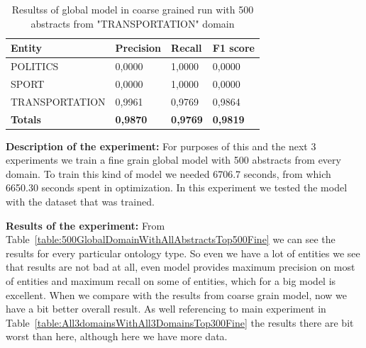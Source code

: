\documentclass[thesis=M,english]{FITthesis}[2018/05/30]
\begin{document}
	\begin{table}[H]\centering
		\begin{tabular}{|l|l|l|l|}
			\hline {\textbf{Entity}} & {\textbf{Precision}} & {\textbf{Recall}} & {\textbf{F1 score}}\\\hline
				POLITICS & 0,0000 & 1,0000 & 0,0000\\
				SPORT & 0,0000 & 1,0000 & 0,0000\\
				TRANSPORTATION & 0,9961 & 0,9769 & 0,9864\\\hline
				\textbf{Totals} & \textbf{0,9870} & \textbf{0,9769} & \textbf{0,9819}\\\hline
		\end{tabular}
		\caption{Resultss of global model in coarse grained run with 500 abstracts from "TRANSPORTATION" domain \label{table:500GlobalDomainWithTransportationTop500Coarse}}
	\end{table}	
		


	\textbf{Description of the experiment:} For purposes of this and the next 3 experiments we train a fine grain global model with 500 abstracts from every domain. To train this kind of model we needed 6706.7 seconds, from which 6650.30 seconds spent in optimization. In this experiment we tested the model with the dataset that was trained. 

	\textbf{Results of the experiment:} From Table~\ref{table:500GlobalDomainWithAllAbstractsTop500Fine} we can see the results for every particular ontology type. So even we have a lot of entities we see that results are not bad at all, even model provides maximum precision on most of entities and maximum recall on some of entities, which for a big model is excellent. When we compare with the results from coarse grain model, now we have a bit better overall result. As well referencing to main experiment in Table~\ref{table:All3domainsWithAll3DomainsTop300Fine} the results there are bit worst than here, although here we have more data.
\end{document}
